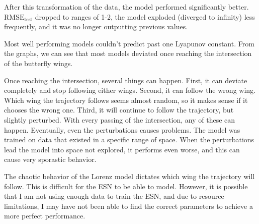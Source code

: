 \documentclass{article}
\begin{document}
After this transformation of the data, the model performed significantly
better. $\text{RMSE}_\text{test}$ dropped to ranges of 1-2, the
model exploded (diverged to infinity) less frequently, and it was no
longer outputting previous values.

Most well performing models couldn't predict past one Lyapunov constant. 
From the graphs, we can see that most models deviated once reaching the
intersection of the butterfly wings.

Once reaching the intersection,
several things can happen. First, it can deviate completely and stop
following either wings. Second, it can follow the wrong wing. Which wing
the trajectory follows seems almost random, so it makes sense if it
chooses the wrong one. Third, it will continue to follow the trajectory,
but slightly perturbed. With every passing of the intersection, any of
these can happen. Eventually, even the perturbations causes problems. 
The model was trained on data that existed in a specific range of space. 
When the perturbations lead the model into space not explored, 
it performs even worse, and this can cause very sporastic behavior.

The chaotic behavior of the Lorenz model dictates which wing the
trajectory will follow. This is difficult for the ESN to be able to
model. However, it is possible that I am not using enough data to train
the ESN, and due to resource limitations, I may have not been able to find
the correct parameters to achieve a more perfect performance.
\end{document}
